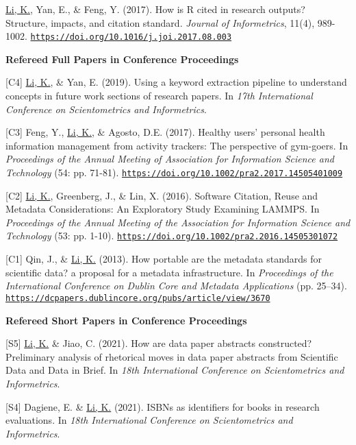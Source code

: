 \documentclass[margin, 10pt]{res} %
\begin{document}
\begin{resume}
[J1] \underline{Li, K.}, Yan, E., \& Feng, Y. (2017). How is R cited in research outputs? Structure, impacts, and citation standard. \textit{Journal of Informetrics}, 11(4), 989-1002. \href{https://doi.org/10.1016/j.joi.2017.08.003}{\nolinkurl{https://doi.org/10.1016/j.joi.2017.08.003}}

\textbf{Refereed Full Papers in Conference Proceedings}

[C4] \underline{Li, K.}, \& Yan, E. (2019). Using a keyword extraction pipeline to understand concepts in future work sections of research papers. In \textit{17th International Conference on Scientometrics and Informetrics}.

[C3] Feng, Y., \underline{Li, K.}, \& Agosto, D.E. (2017). Healthy users’ personal health information management from activity trackers: The perspective of gym-goers. In \textit{Proceedings of the Annual Meeting of Association for Information Science and Technology} (54: pp. 71-81). \href{https://doi.org/10.1002/pra2.2017.14505401009}{\nolinkurl{https://doi.org/10.1002/pra2.2017.14505401009}}

[C2] \underline{Li, K.}, Greenberg, J., \& Lin, X. (2016). Software Citation, Reuse and Metadata Considerations: An Exploratory Study Examining LAMMPS. In \textit{Proceedings of the Annual Meeting of the Association for Information Science and Technology} (53: pp. 1-10). \href{https://doi.org/10.1002/pra2.2016.14505301072}{\nolinkurl{https://doi.org/10.1002/pra2.2016.14505301072}}

[C1] Qin, J., \& \underline{Li, K.} (2013). How portable are the metadata standards for scientific data? a proposal for a metadata infrastructure. In \textit{Proceedings of the International Conference on Dublin Core and Metadata Applications} (pp. 25–34). \href{https://dcpapers.dublincore.org/pubs/article/view/3670}{\nolinkurl{https://dcpapers.dublincore.org/pubs/article/view/3670}}

\textbf{Refereed Short Papers in Conference Proceedings}

[S5] \underline{Li, K.} \& Jiao, C. (2021). How are data paper abstracts constructed? Preliminary analysis of rhetorical moves in data paper abstracts from Scientific Data and Data in Brief. In \textit{18th International Conference on Scientometrics and Informetrics}.

[S4] Dagiene, E. \& \underline{Li, K.} (2021). ISBNs as identifiers for books in research evaluations. In \textit{18th International Conference on Scientometrics and Informetrics}.


\end{resume}
\end{document}
